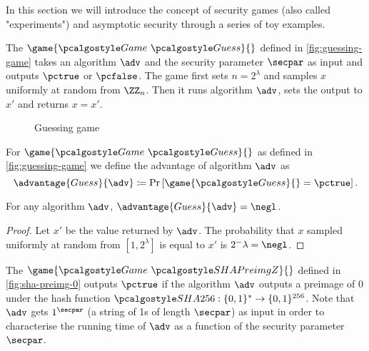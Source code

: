 In this section we will introduce the concept of security games (also called "experiments") and asymptotic security through a series of toy examples.

The $\game{\Game~\algo{Guess}}{}$ defined in \autoref{fig:guessing-game} takes an algorithm $\adv$ and the security parameter $\secpar$ as input and outputs $\pctrue$ or $\pcfalse$.
The game first sets $n = 2^\lambda$ and samples $x$ uniformly at random from $\ZZ_n$.
Then it runs algorithm $\adv$, sets the output to $x'$ and returns $x = x'$.

\begin{figure}[tbhp]
  \begin{center}
    \begin{tcolorbox}[width=3cm]
      \begin{pchstack}[center]
      \end{pchstack}
    \end{tcolorbox}
  \end{center}
  \caption{Guessing game\label{fig:guessing-game}}
\end{figure}

\begin{definition}
  For $\game{\Game~\algo{Guess}}{}$ as defined in \autoref{fig:guessing-game} we define the advantage of algorithm $\adv$ as
 \[
  \advantage{Guess}{\adv} \defeq \pr{\game{\algo{Guess}}{} = \pctrue}.
 \]
\end{definition}

\begin{proposition}
  For any algorithm $\adv$, $\advantage{Guess}{\adv} = \negl$.
\end{proposition}

\begin{proof}
Let $x'$ be the value returned by $\adv$.
The probability that $x$ sampled uniformly at random from $[1, 2^\lambda]$ is equal to $x'$ is $2^-\lambda = \negl$.
\end{proof}

The $\game{\Game~\algo{SHAPreimgZ}}{}$ defined in \autoref{fig:sha-preimg-0} outputs $\pctrue$ if the algorithm $\adv$ outputs a preimage of 0 under the hash function $\algo{SHA256}: \{0, 1\}^* \rightarrow \{0, 1\}^{256}$.
Note that $\adv$ gets $1^{\secpar}$ (a string of 1s of length $\secpar$) as input in order to characterise the running time of $\adv$ as a function of the security parameter $\secpar$.

